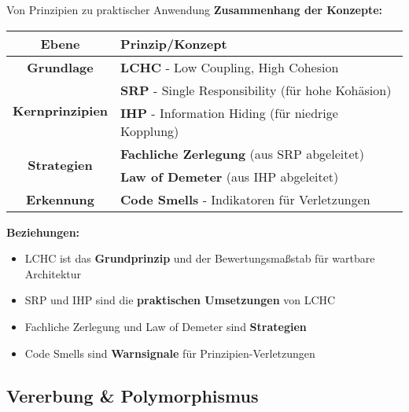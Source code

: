 \begin{frame}{Von Prinzipien zu praktischer Anwendung}
  \textbf{Zusammenhang der Konzepte:}

  \begin{center}
    \begin{tabular}{|c|l|}
      \hline
      \textbf{Ebene} & \textbf{Prinzip/Konzept} \\
      \hline
      \hline
      \textcolor{hhuBlau}{\textbf{Grundlage}} & \textbf{LCHC} - Low Coupling, High Cohesion \\
      \hline
      \multirow{2}{*}{\textcolor{hhuGruen}{\textbf{Kernprinzipien}}} & \textbf{SRP} - Single Responsibility (für hohe Kohäsion) \\
      \cline{2-2}
      & \textbf{IHP} - Information Hiding (für niedrige Kopplung) \\
      \hline
      \multirow{2}{*}{\textcolor{hhuOrange}{\textbf{Strategien}}} & \textbf{Fachliche Zerlegung} (aus SRP abgeleitet) \\
      \cline{2-2}
      & \textbf{Law of Demeter} (aus IHP abgeleitet) \\
      \hline
      \textcolor{hhuRot}{\textbf{Erkennung}} & \textbf{Code Smells} - Indikatoren für Verletzungen \\
      \hline
    \end{tabular}
  \end{center}

  \vspace{0.5cm}

  \textbf{Beziehungen:}
  \begin{itemize}
    \item LCHC ist das \textbf{Grundprinzip} und der Bewertungsmaßstab für wartbare Architektur
    \item SRP und IHP sind die \textbf{praktischen Umsetzungen} von LCHC
    \item Fachliche Zerlegung und Law of Demeter sind \textbf{Strategien}
    \item Code Smells sind \textbf{Warnsignale} für Prinzipien-Verletzungen
  \end{itemize}
\end{frame}


\subsection{Vererbung \& Polymorphismus}


